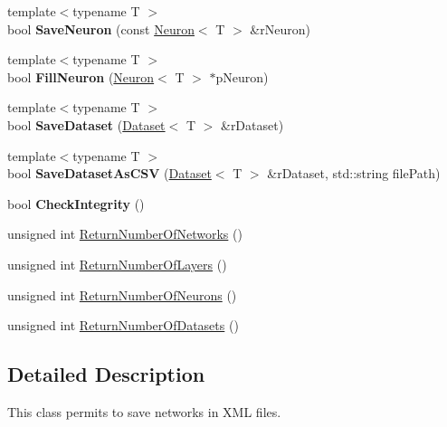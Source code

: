 \begin{DoxyCompactItemize}
\item 
\hypertarget{class_parser_a5bd2432d945fb668ab256fcf9286bcc7}{{\footnotesize template$<$typename T $>$ }\\bool {\bfseries Save\-Neuron} (const \hyperlink{class_neuron}{Neuron}$<$ T $>$ \&r\-Neuron)}\label{class_parser_a5bd2432d945fb668ab256fcf9286bcc7}

\item 
\hypertarget{class_parser_a144823dc8e484a9ccd6b41cfdc903e38}{{\footnotesize template$<$typename T $>$ }\\bool {\bfseries Fill\-Neuron} (\hyperlink{class_neuron}{Neuron}$<$ T $>$ $\ast$p\-Neuron)}\label{class_parser_a144823dc8e484a9ccd6b41cfdc903e38}

\item 
\hypertarget{class_parser_a3e53faee9d796f0ddf21b567826c30e2}{{\footnotesize template$<$typename T $>$ }\\bool {\bfseries Save\-Dataset} (\hyperlink{class_dataset}{Dataset}$<$ T $>$ \&r\-Dataset)}\label{class_parser_a3e53faee9d796f0ddf21b567826c30e2}

\item 
\hypertarget{class_parser_ae95eca02d45e57f346bce044a314afad}{{\footnotesize template$<$typename T $>$ }\\bool {\bfseries Save\-Dataset\-As\-C\-S\-V} (\hyperlink{class_dataset}{Dataset}$<$ T $>$ \&r\-Dataset, std\-::string file\-Path)}\label{class_parser_ae95eca02d45e57f346bce044a314afad}

\item 
\hypertarget{class_parser_a7cf0c8df884455df7535b6114cd117a4}{bool {\bfseries Check\-Integrity} ()}\label{class_parser_a7cf0c8df884455df7535b6114cd117a4}

\item 
unsigned int \hyperlink{class_parser_a60bfa9ffe6cc0f3a53f67a7967239d39}{Return\-Number\-Of\-Networks} ()
\item 
unsigned int \hyperlink{class_parser_afd68c8694b232cc663957a6ae07f6aad}{Return\-Number\-Of\-Layers} ()
\item 
unsigned int \hyperlink{class_parser_a8e11d9659548d11a506790d34beabcae}{Return\-Number\-Of\-Neurons} ()
\item 
unsigned int \hyperlink{class_parser_a39d80043fae9149679012da39bff0f89}{Return\-Number\-Of\-Datasets} ()
\end{DoxyCompactItemize}


\subsection{Detailed Description}
This class permits to save networks in X\-M\-L files. 

